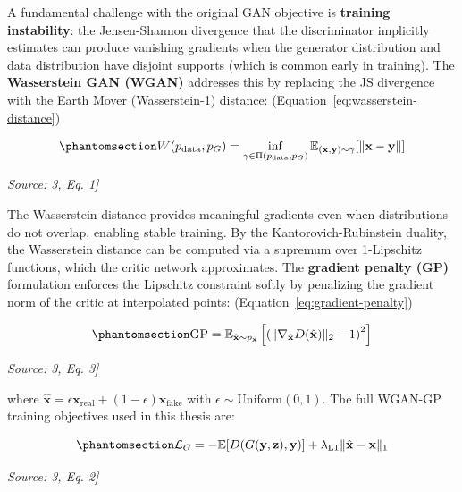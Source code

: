 A fundamental challenge with the original GAN objective is \textbf{training instability}: the Jensen-Shannon divergence that the discriminator implicitly estimates can produce vanishing gradients when the generator distribution and data distribution have disjoint supports (which is common early in training). The \textbf{Wasserstein GAN (WGAN)} addresses this by replacing the JS divergence with the Earth Mover (Wasserstein-1) distance: (Equation~\ref{eq:wasserstein-distance})

\begin{equation}\protect\phantomsection\label{eq:wasserstein-distance}{W(p_{\text{data}}, p_G) = \inf_{\gamma \in \Pi(p_{\text{data}}, p_G)} \mathbb{E}_{(\mathbf{x}, \mathbf{y}) \sim \gamma}[\|\mathbf{x} - \mathbf{y}\|]
}\end{equation} \par{\small\textit{Source: \cite{Laneman2004CooperativeDiversity}3, Eq. 1]}}

The Wasserstein distance provides meaningful gradients even when distributions do not overlap, enabling stable training. By the Kantorovich-Rubinstein duality, the Wasserstein distance can be computed via a supremum over 1-Lipschitz functions, which the critic network approximates. The \textbf{gradient penalty (GP)} formulation \cite{Gulrajani2017WGANgp} enforces the Lipschitz constraint softly by penalizing the gradient norm of the critic at interpolated points: (Equation~\ref{eq:gradient-penalty})

\begin{equation}\protect\phantomsection\label{eq:gradient-penalty}{\text{GP} = \mathbb{E}_{\hat{\mathbf{x}} \sim p_{\hat{\mathbf{x}}}}\left[\left(\|\nabla_{\hat{\mathbf{x}}} D(\hat{\mathbf{x}})\|_2 - 1\right)^2\right]
}\end{equation} \par{\small\textit{Source: \cite{Laneman2004CooperativeDiversity}3, Eq. 3]}}

where \(\hat{\mathbf{x}} = \epsilon \mathbf{x}_{\text{real}} + (1-\epsilon) \mathbf{x}_{\text{fake}}\) with \(\epsilon \sim \text{Uniform}(0, 1)\). The full WGAN-GP training objectives used in this thesis are:

\begin{equation}\protect\phantomsection\label{eq:wgan-gen-loss}{\mathcal{L}_G = -\mathbb{E}[D(G(\mathbf{y}, \mathbf{z}), \mathbf{y})] + \lambda_{\text{L1}} \|\hat{\mathbf{x}} - \mathbf{x}\|_1
}\end{equation} \par{\small\textit{Source: \cite{Laneman2004CooperativeDiversity}3, Eq. 2]}}


